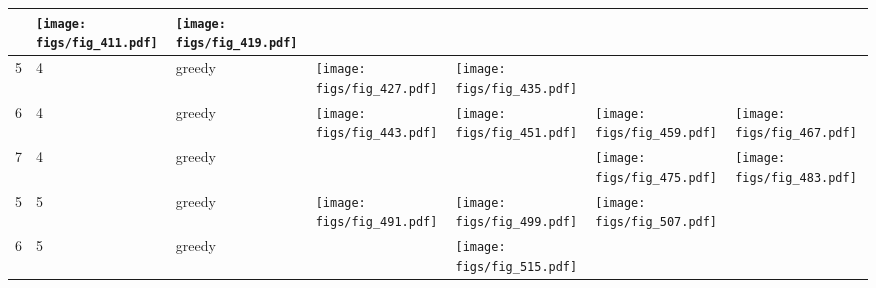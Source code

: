 \documentclass[oneside,canadian,landscape]{article}
\begin{document}
\begin{center}
\begin{longtable}{|l|l|l||l|l|l|l|}
&\begin{minipage}{3.5cm}
\texttt{[image: figs/fig\_411.pdf]}
\end{minipage}
&\begin{minipage}{3.5cm}
\texttt{[image: figs/fig\_419.pdf]}
\end{minipage}
\\ \hline
5&4&greedy&\begin{minipage}{3.5cm}
\texttt{[image: figs/fig\_427.pdf]}
\end{minipage}
&\begin{minipage}{3.5cm}
\texttt{[image: figs/fig\_435.pdf]}
\end{minipage}
&&\\ \hline
6&4&greedy&\begin{minipage}{3.5cm}
\texttt{[image: figs/fig\_443.pdf]}
\end{minipage}
&\begin{minipage}{3.5cm}
\texttt{[image: figs/fig\_451.pdf]}
\end{minipage}
&\begin{minipage}{3.5cm}
\texttt{[image: figs/fig\_459.pdf]}
\end{minipage}
&\begin{minipage}{3.5cm}
\texttt{[image: figs/fig\_467.pdf]}
\end{minipage}
\\ \hline
7&4&greedy&&&\begin{minipage}{3.5cm}
\texttt{[image: figs/fig\_475.pdf]}
\end{minipage}
&\begin{minipage}{3.5cm}
\texttt{[image: figs/fig\_483.pdf]}
\end{minipage}
\\ \hline
5&5&greedy&\begin{minipage}{3.5cm}
\texttt{[image: figs/fig\_491.pdf]}
\end{minipage}
&\begin{minipage}{3.5cm}
\texttt{[image: figs/fig\_499.pdf]}
\end{minipage}
&\begin{minipage}{3.5cm}
\texttt{[image: figs/fig\_507.pdf]}
\end{minipage}
&\\ \hline
6&5&greedy&&\begin{minipage}{3.5cm}
\texttt{[image: figs/fig\_515.pdf]}

\end{minipage}
\end{longtable}
\end{center}
\end{document}
